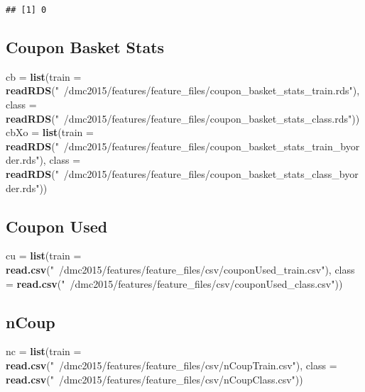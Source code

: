 \documentclass[10pt]{report}
\newenvironment{Shaded}{}{}
\newcommand{\KeywordTok}[1]{\textcolor[rgb]{0.00,0.44,0.13}{\textbf{{#1}}}}
\newcommand{\DataTypeTok}[1]{\textcolor[rgb]{0.56,0.13,0.00}{{#1}}}
\newcommand{\StringTok}[1]{\textcolor[rgb]{0.25,0.44,0.63}{{#1}}}
\newcommand{\NormalTok}[1]{{#1}}
\begin{document}
\begin{verbatim}
## [1] 0
\end{verbatim}

\subsection{Coupon Basket Stats}\label{coupon-basket-stats}

\begin{Shaded}
\begin{Highlighting}[]
\NormalTok{cb =}\StringTok{ }\KeywordTok{list}\NormalTok{(}\DataTypeTok{train =} \KeywordTok{readRDS}\NormalTok{(}\StringTok{"~/dmc2015/features/feature_files/coupon_basket_stats_train.rds"}\NormalTok{), }
    \DataTypeTok{class =} \KeywordTok{readRDS}\NormalTok{(}\StringTok{"~/dmc2015/features/feature_files/coupon_basket_stats_class.rds"}\NormalTok{))}
\NormalTok{cbXo =}\StringTok{ }\KeywordTok{list}\NormalTok{(}\DataTypeTok{train =} \KeywordTok{readRDS}\NormalTok{(}\StringTok{"~/dmc2015/features/feature_files/coupon_basket_stats_train_byorder.rds"}\NormalTok{), }
    \DataTypeTok{class =} \KeywordTok{readRDS}\NormalTok{(}\StringTok{"~/dmc2015/features/feature_files/coupon_basket_stats_class_byorder.rds"}\NormalTok{))}
\end{Highlighting}
\end{Shaded}

\subsection{Coupon Used}\label{coupon-used}

\begin{Shaded}
\begin{Highlighting}[]
\NormalTok{cu =}\StringTok{ }\KeywordTok{list}\NormalTok{(}\DataTypeTok{train =} \KeywordTok{read.csv}\NormalTok{(}\StringTok{"~/dmc2015/features/feature_files/csv/couponUsed_train.csv"}\NormalTok{), }
    \DataTypeTok{class =} \KeywordTok{read.csv}\NormalTok{(}\StringTok{"~/dmc2015/features/feature_files/csv/couponUsed_class.csv"}\NormalTok{))}
\end{Highlighting}
\end{Shaded}

\subsection{nCoup}\label{ncoup}

\begin{Shaded}
\begin{Highlighting}[]
\NormalTok{nc =}\StringTok{ }\KeywordTok{list}\NormalTok{(}\DataTypeTok{train =} \KeywordTok{read.csv}\NormalTok{(}\StringTok{"~/dmc2015/features/feature_files/csv/nCoupTrain.csv"}\NormalTok{), }
    \DataTypeTok{class =} \KeywordTok{read.csv}\NormalTok{(}\StringTok{"~/dmc2015/features/feature_files/csv/nCoupClass.csv"}\NormalTok{))}
\end{Highlighting}
\end{Shaded}
\end{document}
